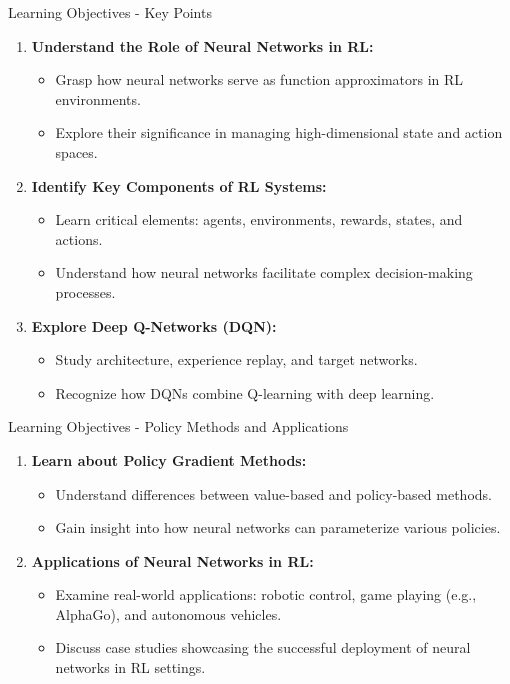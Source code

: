 \documentclass[aspectratio=169]{beamer}
\begin{document}
\begin{frame}[fragile]{Learning Objectives - Key Points}
    \begin{enumerate}
        \item \textbf{Understand the Role of Neural Networks in RL:}
            \begin{itemize}
                \item Grasp how neural networks serve as function approximators in RL environments.
                \item Explore their significance in managing high-dimensional state and action spaces.
            \end{itemize}
            
        \item \textbf{Identify Key Components of RL Systems:}
            \begin{itemize}
                \item Learn critical elements: agents, environments, rewards, states, and actions.
                \item Understand how neural networks facilitate complex decision-making processes.
            \end{itemize}
            
        \item \textbf{Explore Deep Q-Networks (DQN):}
            \begin{itemize}
                \item Study architecture, experience replay, and target networks.
                \item Recognize how DQNs combine Q-learning with deep learning.
            \end{itemize}
    \end{enumerate}
\end{frame}

\begin{frame}[fragile]{Learning Objectives - Policy Methods and Applications}
    \begin{enumerate}[resume]
        \item \textbf{Learn about Policy Gradient Methods:}
            \begin{itemize}
                \item Understand differences between value-based and policy-based methods.
                \item Gain insight into how neural networks can parameterize various policies.
            \end{itemize}
            
        \item \textbf{Applications of Neural Networks in RL:}
            \begin{itemize}
                \item Examine real-world applications: robotic control, game playing (e.g., AlphaGo), and autonomous vehicles.
                \item Discuss case studies showcasing the successful deployment of neural networks in RL settings.
            \end{itemize}
    \end{enumerate}
\end{frame}
\end{document}
